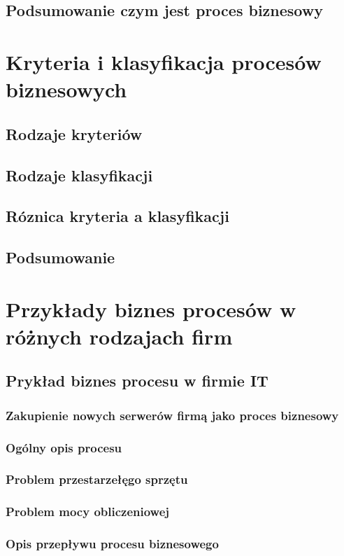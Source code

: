 \documentclass[a4paper, 12pt]{article}
\begin{document}
\subsection{Podsumowanie czym jest proces biznesowy} 

\section{Kryteria i klasyfikacja procesów biznesowych}
\subsection{Rodzaje kryteriów}
\subsection{Rodzaje klasyfikacji}
\subsection{Róznica kryteria a klasyfikacji}
\subsection{Podsumowanie}

\section{Przykłady biznes procesów w różnych rodzajach firm}
\subsection{Prykład biznes procesu w firmie IT}
\subsubsection{Zakupienie nowych serwerów firmą jako proces biznesowy}
\subsubsection{Ogólny opis procesu}
\subsubsection{Problem przestarzełęgo sprzętu} 
\subsubsection{Problem mocy obliczeniowej} 
\subsubsection{Opis przepływu procesu biznesowego}
\end{document}
